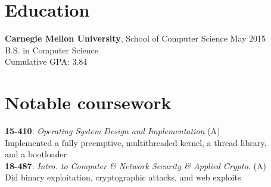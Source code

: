 \documentclass[margin]{res}
\newcommand{\course}[4]{ %
    \textbf{#1}: \textit{#2} (#4)\\
      #3
      \vspace{1em}
    \\}
\begin{document}

\address{
  5032 Forbes Avenue SMC 6899 \\
  Pittsburgh, PA 15289-6899 \\
  (302) 468-7537
}
\address{  %
  \hfill \href{mailto:joshz@joshz.org}{joshz@joshz.org} \\
  \hfill
    \href{https://github.com/joshzimmerman}{https://github.com/joshzimmerman} \\
  \hfill \href{http://joshz.org}{http://joshz.org}
}

\begin{resume}

\section{Education}
  \textbf{Carnegie Mellon University}, School of Computer Science
    \hfill May 2015\\
  B.S. in Computer Science\\
  Cumulative GPA: 3.84

\section{Notable coursework}
 \course{15-410}{Operating System Design and Implementation}
 {Implemented a fully preemptive, multithreaded kernel, a thread library,\\ and a bootloader}{A}
  \course{18-487}{Intro. to Computer \& Network Security \& Applied Crypto.}
 {Did binary exploitation, cryptographic attacks, and web exploits}{A}
      \vspace{-2em}


\end{resume}
\end{document}
